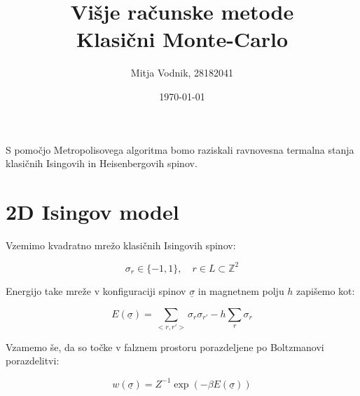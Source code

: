 \documentclass[a4paper]{article}
\newcommand{\s}{\sigma}
\newcommand{\us}{\underline{\s}}
\begin{document}
    \title{\sc\large Višje računske metode\\
		\bigskip
		\bf\Large Klasični Monte-Carlo}
	\author{Mitja Vodnik, 28182041}
	\date{\today}
	\maketitle

    S pomočjo Metropolisovega algoritma bomo raziskali ravnovesna termalna stanja klasičnih Isingovih in Heisenbergovih
    spinov.

    \section{2D Isingov model}

    Vzemimo kvadratno mrežo klasičnih Isingovih spinov:

    \begin{equation}\label{eq1}
        \s_r \in \{ -1, 1 \}, \quad r \in L \subset \mathbb{Z}^2
    \end{equation}

    Energijo take mreže v konfiguraciji spinov $\us$ in magnetnem polju $h$ zapišemo kot:

    \begin{equation}\label{eq2}
        E(\us) = \sum_{<r, r'>} \s_r \s_{r'} - h\sum_r \s_r
    \end{equation}

    Vzamemo še, da so točke v falznem prostoru porazdeljene po Boltzmanovi porazdelitvi:

    \begin{equation}\label{eq3}
        w(\us) = Z^{-1}\exp(-\beta E(\us))
    \end{equation}

    \iffalse
    \begin{figure}
        \centering
        \texttt{[image: slika16.pdf]}
        \caption{Odvisnost toka $J$ med termostatom in verigo v odvisnosti od časa vzorčenja $\tau$.
        Računano je na anharmonski ($\lambda = 1$) verigi dolžine $N = 10$ in povprečeno po $1000$ vzorcih.
        $J_1$ se nanaša na tok na levi, $J_2$ pa na desni strani verige.}
        \label{slika6}
    \end{figure}
    \fi
\end{document}
